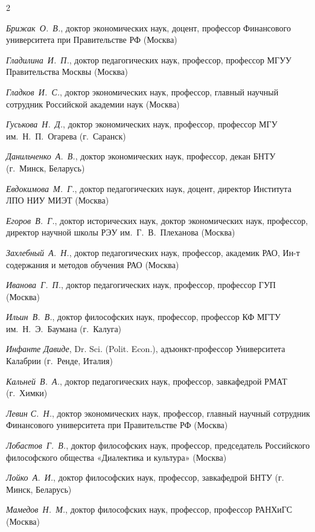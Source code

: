 \begin{multicols}{2}
\begin{flushleft}
    \noindent \textit{Брижак О. В.}, доктор экономических наук, доцент, профессор Финансового университета при Правительстве РФ (Москва)
    
    \noindent \textit{Гладилина И. П.}, доктор педагогических наук, профессор, профессор МГУУ Правительства Москвы (Москва)
    
    \noindent \textit{Гладков И. С.}, доктор экономических наук, профессор, главный научный сотрудник Российской академии наук (Москва)
    
    \noindent \textit{Гуськова Н. Д.}, доктор экономических наук, профессор, профессор МГУ им. Н. П. Огарева (г. Саранск)
    
    \noindent \textit{Данильченко А. В.}, доктор экономических наук, профессор, декан БНТУ (г. Минск, Беларусь)
    
    \noindent \textit{Евдокимова М. Г.}, доктор педагогических наук, доцент, директор Института ЛПО НИУ МИЭТ (Москва)
    
    \noindent \textit{Егоров В. Г.}, доктор исторических наук, доктор экономических наук, профессор, директор научной школы РЭУ им. Г. В. Плеханова (Москва)
    
    \noindent \textit{Захлебный А. Н.}, доктор педагогических наук, профессор, академик РАО, Ин-т содержания и методов обучения РАО (Москва)
    
    \noindent \textit{Иванова Г. П.}, доктор педагогических наук, профессор, профессор ГУП (Москва)
    
    \noindent \textit{Ильин В. В.}, доктор философских наук, профессор, профессор КФ МГТУ им. Н. Э. Баумана (г. Калуга)
    
    \noindent \textit{Инфанте Давиде}, Dr. Sci. (Polit. Econ.), адъюнкт-профессор Университета Калабрии (г. Ренде, Италия)
    
    \noindent \textit{Кальней В. А.}, доктор педагогических наук, профессор, завкафедрой РМАТ (г. Химки)

    \noindent \textit{Левин С. Н.}, доктор экономических наук, профессор, главный научный сотрудник Финансового университета при Правительстве РФ (Москва)
    
    \noindent \textit{Лобастов Г. В.}, доктор философских наук, профессор, председатель Российского философского общества «Диалектика и культура» (Москва)
    
    \noindent \textit{Лойко А. И.}, доктор философских наук, профессор, завкафедрой БНТУ (г. Минск, Беларусь)
    
    \noindent \textit{Мамедов Н. М.}, доктор философских наук, профессор, профессор РАНХиГС (Москва)
    

\end{flushleft}
\end{multicols}
